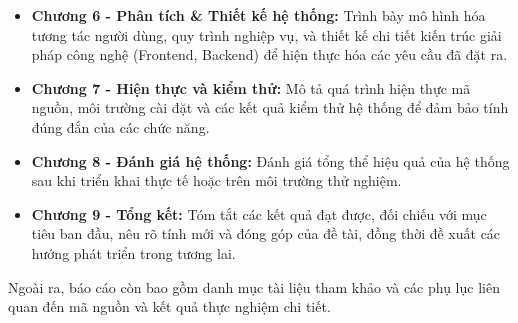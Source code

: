 \begin{itemize}
\item \textbf{Chương 6 - Phân tích \& Thiết kế hệ thống:} Trình bày mô hình hóa tương tác người dùng, quy trình nghiệp vụ, và thiết kế chi tiết kiến trúc giải pháp công nghệ (Frontend, Backend) để hiện thực hóa các yêu cầu đã đặt ra.

\item \textbf{Chương 7 - Hiện thực và kiểm thử:} Mô tả quá trình hiện thực mã nguồn, môi trường cài đặt và các kết quả kiểm thử hệ thống để đảm bảo tính đúng đắn của các chức năng.

\item \textbf{Chương 8 - Đánh giá hệ thống:} Đánh giá tổng thể hiệu quả của hệ thống sau khi triển khai thực tế hoặc trên môi trường thử nghiệm.

\item \textbf{Chương 9 - Tổng kết:} Tóm tắt các kết quả đạt được, đối chiếu với mục tiêu ban đầu, nêu rõ tính mới và đóng góp của đề tài, đồng thời đề xuất các hướng phát triển trong tương lai.
\end{itemize}

Ngoài ra, báo cáo còn bao gồm danh mục tài liệu tham khảo và các phụ lục liên quan đến mã nguồn và kết quả thực nghiệm chi tiết.